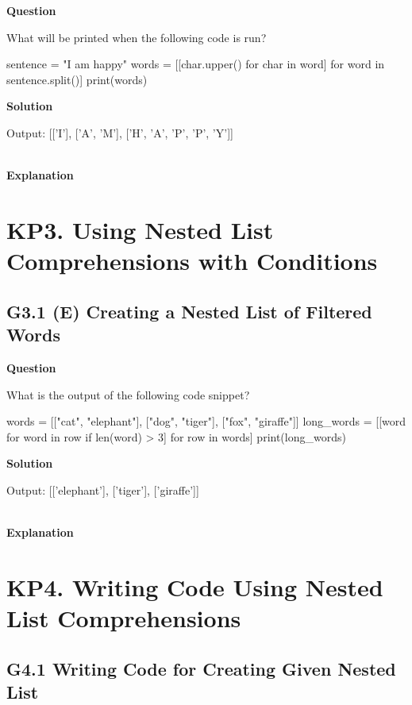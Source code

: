 \documentclass[10pt]{extarticle}
\begin{document}
\textbf{Question}

What will be printed when the following code is run?

    \begin{python}
    sentence = "I am happy"
    words = [[char.upper() for char in word] for word in sentence.split()]
    print(words)

    \end{python}

\noindent\textbf{Solution}

\begin{python}
Output: [['I'], ['A', 'M'], ['H', 'A', 'P', 'P', 'Y']]
\end{python}  \\

\noindent\textbf{Explanation}

\section*{KP3. Using Nested List Comprehensions with Conditions}
\subsection*{G3.1 (E) Creating a Nested List of Filtered Words}

\textbf{Question}

What is the output of the following code snippet?

    \begin{python}
    words = [["cat", "elephant"], ["dog", "tiger"], ["fox", "giraffe"]]
    long_words = [[word for word in row if len(word) > 3] for row in words]
    print(long_words)
    \end{python}

\noindent\textbf{Solution}

\begin{python}
Output: [['elephant'], ['tiger'], ['giraffe']]
\end{python}  \\

\noindent\textbf{Explanation}

\section*{KP4. Writing Code Using Nested List Comprehensions}
\subsection*{G4.1 Writing Code for Creating Given Nested List}
\end{document}
